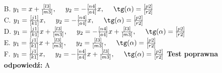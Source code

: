 \documentclass[12pt, a4paper]{article}
\theoremstyle{definition} %
\newcommand{\testStop}{\newline} %
\newcommand{\kluczStart}{\noindent \textbf{Test poprawna odpowiedź:}\newline} %
\newcommand{\kluczStop}{\newline} %
\begin{document}
B. $y_1=x +\frac{[l3]}{[m3]}, \ \ \ \ y_2= - \frac{[n4]}{[a4]}x, \ \ \ \ \tg(\alpha)=\frac{[p2]}{[r2]}$\\
C. $y_1=\frac{[j1]}{[k1]}x, \ \ \ \ y_2= - \frac{[n4]}{[a4]}x, \ \ \ \ \tg(\alpha)=\frac{[p2]}{[r2]}$\\
D. $y_1=\frac{[j1]}{[k1]}x +\frac{[l3]}{[m3]}, \ \ \ \ y_2= - \frac{[n4]}{[a4]}x+\frac{[l3]}{[m3]}, \ \ \ \ \tg(\alpha)=\frac{[p2]}{[r2]}$\\
E. $y_1=\frac{[j1]}{[k1]}x +\frac{[l3]}{[m3]}, \ \ \ \ y_2= \frac{[l3]}{[m3]}, \ \ \ \ \tg(\alpha)=\frac{[p2]}{[r2]}$\\
F. $y_1=\frac{[j1]}{[k1]}x, \ \ \ \ y_2= - \frac{[n4]}{[a4]}x+ \frac{[l3]}{[m3]}, \ \ \ \ \tg(\alpha)=\frac{[p2]}{[r2]}$
\testStop
\kluczStart
A
\kluczStop
\end{document}
